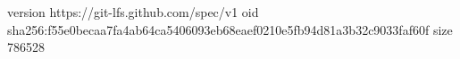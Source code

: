 version https://git-lfs.github.com/spec/v1
oid sha256:f55e0becaa7fa4ab64ca5406093eb68eaef0210e5fb94d81a3b32c9033faf60f
size 786528
